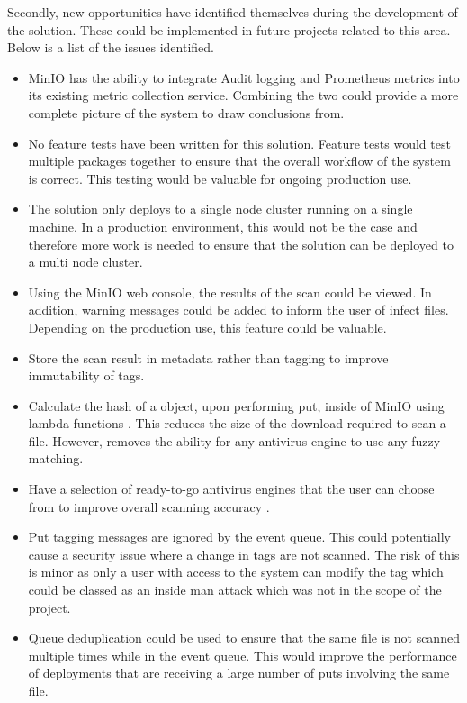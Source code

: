 \documentclass[12pt, conference, final, a4paper, onecolumn, compsoc]{IEEEtran}
\begin{document}
Secondly, new opportunities have identified themselves during the development of
the solution. These could be implemented in future projects related to this
area. Below is a list of the issues identified.

\begin{itemize}
  \item MinIO has the ability to integrate Audit logging and Prometheus metrics
        into its existing metric collection service. Combining the two could
        provide a more complete picture of the system to draw conclusions from.
  \item No feature tests have been written for this solution. Feature tests
        would test multiple packages together to ensure that the overall
        workflow of the system is correct. This testing would be valuable for
        ongoing production use.
  \item The solution only deploys to a single node cluster running on a single
        machine. In a production environment, this would not be the case and
        therefore more work is needed to ensure that the solution can be
        deployed to a multi node cluster.
  \item Using the MinIO web console, the results of the scan could be viewed. In
        addition, warning messages could be added to inform the user of infect
        files. Depending on the production use, this feature could be valuable.
  \item Store the scan result in metadata rather than tagging to improve
        immutability of tags.
  \item Calculate the hash of a object, upon performing put, inside of MinIO
        using lambda functions \citep{minio-lambda}. This reduces the size of
        the download required to scan a file. However, removes the ability for any
        antivirus engine to use any fuzzy matching.
  \item Have a selection of ready-to-go antivirus engines that the user can
        choose from to improve overall scanning accuracy \citep{av-comparison}.
  \item Put tagging messages are ignored by the event queue. This could
        potentially cause a security issue where a change in tags are not
        scanned. The risk of this is minor as only a user with access to the
        system can modify the tag which could be classed as an inside man attack
        which was not in the scope of the project.
  \item Queue deduplication could be used to ensure that the same file is not
        scanned multiple times while in the event queue. This would improve the
        performance of deployments that are receiving a large number of puts
        involving the same file.
\end{itemize}
\end{document}
